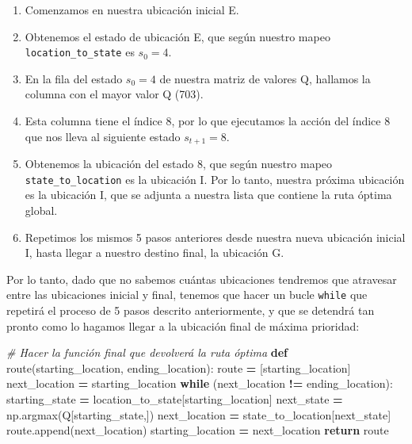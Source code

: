 \documentclass[
]{book}
\newenvironment{Shaded}{\begin{snugshade}}{\end{snugshade}}
\newcommand{\CommentTok}[1]{\textcolor[rgb]{0.56,0.35,0.01}{\textit{#1}}}
\newcommand{\ControlFlowTok}[1]{\textcolor[rgb]{0.13,0.29,0.53}{\textbf{#1}}}
\newcommand{\KeywordTok}[1]{\textcolor[rgb]{0.13,0.29,0.53}{\textbf{#1}}}
\newcommand{\NormalTok}[1]{#1}
\newcommand{\OperatorTok}[1]{\textcolor[rgb]{0.81,0.36,0.00}{\textbf{#1}}}
\providecommand{\tightlist}{%
  \setlength{\itemsep}{0pt}\setlength{\parskip}{0pt}}
\begin{document}
\begin{enumerate}
\def\labelenumi{\arabic{enumi}.}
\tightlist
\item
  Comenzamos en nuestra ubicación inicial E.
\item
  Obtenemos el estado de ubicación E, que según nuestro mapeo \texttt{location\_to\_state} es \(s_0 = 4\).
\item
  En la fila del estado \(s_0 = 4\) de nuestra matriz de valores Q, hallamos la columna con el mayor valor Q (703).
\item
  Esta columna tiene el índice 8, por lo que ejecutamos la acción del índice 8 que nos lleva al siguiente estado \(s_{t+1} = 8\).
\item
  Obtenemos la ubicación del estado 8, que según nuestro mapeo \texttt{state\_to\_location} es la ubicación I. Por lo tanto, nuestra próxima ubicación es la ubicación I, que se adjunta a nuestra lista que contiene la ruta óptima global.
\item
  Repetimos los mismos 5 pasos anteriores desde nuestra nueva ubicación inicial I, hasta llegar a nuestro destino final, la ubicación G.
\end{enumerate}

Por lo tanto, dado que no sabemos cuántas ubicaciones tendremos que atravesar entre las ubicaciones inicial y final, tenemos que hacer un bucle \texttt{while} que repetirá el proceso de 5 pasos descrito anteriormente, y que se detendrá tan pronto como lo hagamos llegar a la ubicación final de máxima prioridad:

\begin{Shaded}
\begin{Highlighting}[]
\CommentTok{\# Hacer la función final que devolverá la ruta óptima}
\KeywordTok{def}\NormalTok{ route(starting\_location, ending\_location):}
\NormalTok{    route }\OperatorTok{=}\NormalTok{ [starting\_location]}
\NormalTok{    next\_location }\OperatorTok{=}\NormalTok{ starting\_location}
    \ControlFlowTok{while}\NormalTok{ (next\_location }\OperatorTok{!=}\NormalTok{ ending\_location):}
\NormalTok{        starting\_state }\OperatorTok{=}\NormalTok{ location\_to\_state[starting\_location]}
\NormalTok{        next\_state }\OperatorTok{=}\NormalTok{ np.argmax(Q[starting\_state,])}
\NormalTok{        next\_location }\OperatorTok{=}\NormalTok{ state\_to\_location[next\_state]}
\NormalTok{        route.append(next\_location)}
\NormalTok{        starting\_location }\OperatorTok{=}\NormalTok{ next\_location}
    \ControlFlowTok{return}\NormalTok{ route}
\end{Highlighting}
\end{Shaded}
\end{document}
